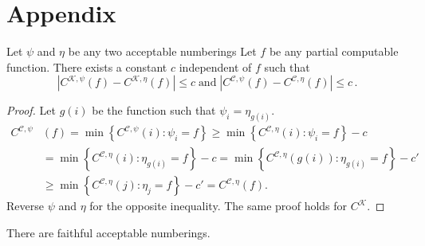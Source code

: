 \documentclass{style/llncs}
\newcommand{\C}{\mathscr C}
\newcommand{\K}{\mathscr K}
\newcommand{\p}{\,\text{.}}
\begin{document}
\section{Appendix}
\begin{lemma}
Let $\psi$ and $\eta$ be any two acceptable numberings Let $f$ be any partial computable function. There exists a constant $c$ independent of $f$ such that \belowdisplayskip=-12pt
\[
\left| C^{\K,\psi}(f) - C^{\K, \eta}(f)\right | \leq c \;\text{and}\; \left| C^{\C,\psi}(f) - C^{\C, \eta}(f)\right | \leq c \p
\] \label{lemma:invariance}
\end{lemma}
\begin{proof}
Let $g(i)$ be the function such that $\psi_i=\eta_{g(i)}$.
\begin{align*}
C^{\C,\psi}&(f) = \min\left\{ C^{\C,\psi}(i) : \psi_i= f\right\} 
\geq \min\left\{ C^{\C, \eta}(i) : \psi_i= f\right\} - c\\
&= \min\left\{ C^{\C, \eta}(i) : \eta_{g(i)}= f\right\} - c
= \min\left\{ C^{\C, \eta}(g(i)) : \eta_{g(i)}= f\right\} - c'\\
&\geq \min\left\{ C^{\C, \eta}(j) : \eta_j= f\right\} - c' 
= C^{\C, \eta}(f).
\end{align*}
Reverse $\psi$ and $\eta$ for the opposite inequality. The same proof holds for $C^\K$.
\end{proof}

\begin{lemma}\label{lemma:faithful-numberings}
  There are faithful acceptable numberings.
\end{lemma}
\end{document}
